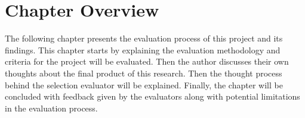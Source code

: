 \section{Chapter Overview}

The following chapter presents the evaluation process of this project and its findings. This chapter starts by explaining the evaluation methodology and criteria for the project will be evaluated. Then the author discusses their own thoughts about the final product of this research. Then the thought process behind the selection evaluator will be explained. Finally, the chapter will be concluded with feedback given by the evaluators along with potential limitations in the evaluation process.